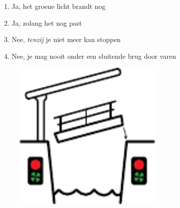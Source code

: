 \begin{figure}[H]	
	\vspace{-10px}
	\begin{minipage}[]{0.70\textwidth}
		\begin{enumerate}[topsep=0pt, label=\Alph*.]
			\item Ja, het groene licht brandt nog
			\item Ja, zolang het nog past
			\item Nee, \textit{tenzij} je niet meer kan stoppen
			\item Nee, je mag nooit onder een sluitende brug door varen
		\end{enumerate}
	\end{minipage}
	\begin{minipage}[]{0.29\textwidth}
		\begin{figure}[H]
			\includegraphics[width=0.80\textwidth,right]{Hoofdstukken/Bruggen/pdf/brug_sluitend.pdf}
		\end{figure}
	\end{minipage}
	\vspace{-10px}
\end{figure}
